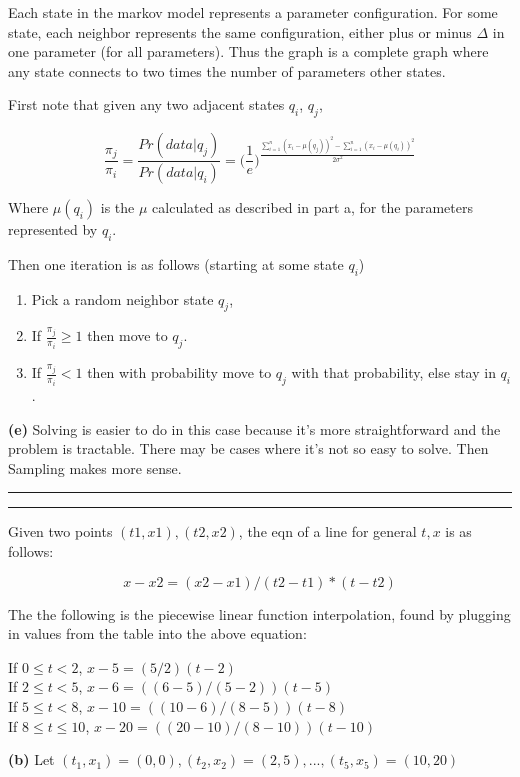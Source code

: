 \documentclass[11pt,letterpaper]{article}
\newcommand{\question}[1] {\vspace{.25in} \hrule\vspace{0.5em}
\noindent{\bf #1} \vspace{0.5em}
\hrule \vspace{.10in}}
\renewcommand{\part}[1] {\vspace{.10in} {\bf (#1)}}
\begin{document}
Each state in the markov model represents a parameter configuration.
For some state, each neighbor represents
the same configuration, either plus or minus $\Delta$ in one parameter (for all parameters).
Thus the graph is a complete graph where any state connects to two times
the number of parameters other states.

First note that given any two adjacent states $q_i$, $q_j$,

$$\frac{\pi_j}{\pi_i} = \frac{Pr(data | q_j)}{Pr(data | q_i)} = \bigg(\frac{1}{e}\bigg)^{\frac{\sum_{i=1}^{n} (x_i-\mu(q_j))^2 - \sum_{i=1}^{n} (x_i-\mu(q_i))^2}{2\sigma^2}}$$

Where $\mu(q_i)$ is the $\mu$ calculated as described in part a, for the parameters represented by $q_i$.

Then one iteration is as follows (starting at some state $q_i$)

\begin{enumerate}
\item Pick a random neighbor state $q_j$,
\item If $\frac{\pi_j}{\pi_i} \geq 1$ then move to $q_j$.
\item If $\frac{\pi_j}{\pi_i} < 1$ then with probability move to $q_j$ with that probability, else stay in $q_i$.
\end{enumerate}


\part{e}
Solving is easier to do in this case because it's more straightforward and the problem is tractable.
There may be cases where it's not so easy to solve. Then Sampling makes more sense.

\question{3}
Given two points $(t1,x1),(t2,x2)$, the eqn of a line for general $t,x$ is as follows:

$$x - x2 = (x2 - x1)/(t2 - t1) * (t - t2)$$

The the following is the piecewise linear function interpolation, found by plugging in values from the table into the above equation:

If $0 \leq t < 2$, $x - 5 = (5/2)(t - 2)$\\
If $2 \leq t < 5$, $x-6 = ((6-5)/(5-2))(t - 5)$\\
If $5 \leq t < 8$, $x-10 = ((10-6)/(8-5))(t - 8)$\\
If $8 \leq t \leq 10$, $x-20 = ((20-10)/(8-10))(t - 10)$

\part{b}
Let $(t_1, x_1) = (0,0), (t_2, x_2) = (2,5), ... , (t_5,x_5) = (10,20) $
\end{document}
